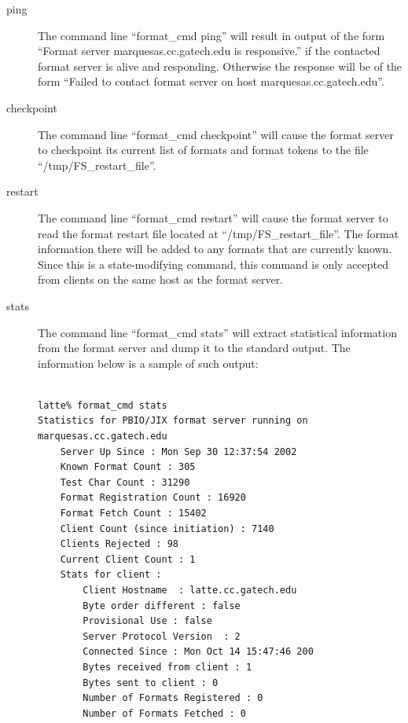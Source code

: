 \documentclass{article}
\begin{document}
\begin{description}
\item[ping] The command line ``format\_cmd ping'' will result in output of
the form ``Format server marquesas.cc.gatech.edu is responsive.'' if the
contacted format server is alive and responding.  Otherwise the response
will be of the form ``Failed to contact format server on host
marquesas.cc.gatech.edu''.
\item[checkpoint] The command line ``format\_cmd checkpoint'' will cause the
format server to checkpoint its current list of formats and format tokens to
the file ``/tmp/FS\_restart\_file''.
\item[restart] The command line ``format\_cmd restart'' will cause the
format server to read the format restart file located at ``/tmp/FS\_restart\_file''.  The format
information there will be added to any formats that are currently known.
Since this is a state-modifying command, this command is only accepted from
clients on the same host as the format server.
\item[stats] The command line ``format\_cmd stats'' will extract statistical
information from the format server and dump it to the standard output.  The
information below is a sample of such output:
\begin{verbatim}

latte% format_cmd stats
Statistics for PBIO/JIX format server running on marquesas.cc.gatech.edu 
    Server Up Since : Mon Sep 30 12:37:54 2002 
    Known Format Count : 305 
    Test Char Count : 31290 
    Format Registration Count : 16920 
    Format Fetch Count : 15402 
    Client Count (since initiation) : 7140 
    Clients Rejected : 98 
    Current Client Count : 1 
    Stats for client : 
        Client Hostname  : latte.cc.gatech.edu 
        Byte order different : false 
        Provisional Use : false 
        Server Protocol Version  : 2 
        Connected Since : Mon Oct 14 15:47:46 200 
        Bytes received from client : 1 
        Bytes sent to client : 0 
        Number of Formats Registered : 0 
        Number of Formats Fetched : 0 
\end{verbatim}
\end{description}
\end{document}
